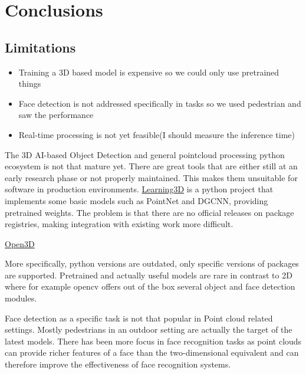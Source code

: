 %
\chapter{Conclusions}
\label{sec:conclusions}

\section{Limitations}

\begin{itemize}
	\item Training a 3D based model is expensive so we could only use pretrained things
	\item Face detection is not addressed specifically in tasks so we used pedestrian and saw the performance
	\item Real-time processing is not yet feasible(I should measure the inference time)
\end{itemize}

\par The 3D AI-based Object Detection and general pointcloud processing python ecosystem is not that mature yet.
There are great tools that are either still at an early research phase or not properly maintained. This makes them unsuitable for software in production environments.
\href{https://github.com/vinits5/learning3d}{Learning3D} is a python project that implements some basic models such as PointNet and DGCNN, providing pretrained weights.
The problem is that there are no official releases on package registries, making integration with existing work more difficult.

\href{https://github.com/isl-org/Open3D/}{Open3D}

More specifically, python versions are outdated, only specific versions of packages are supported.
Pretrained and actually useful models are rare in contrast to 2D where for example opencv offers
out of the box several object and face detection modules.

\par Face detection as a specific task is not that popular in Point cloud related settings. Mostly pedestrians in an outdoor setting are actually the target of the latest models. There has been more focus in face recognition tasks as point clouds can provide richer features of a face than the two-dimensional equivalent and can therefore improve the effectiveness of face recognition systems.

